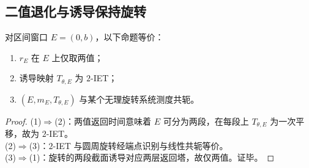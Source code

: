 \subsection{二值退化与诱导保持旋转}

\begin{theorem}[两值退化的动力学等价性]\label{thm:two-value-iet}
对区间窗口 $E=(0,b)$，以下命题等价：
\begin{enumerate}
  \item $r_E$ 在 $E$ 上仅取两值；
  \item 诱导映射 $T_{\theta,E}$ 为 $2$-IET；
  \item $(E,m_E,T_{\theta,E})$ 与某个无理旋转系统测度共轭。
\end{enumerate}
\end{theorem}

\begin{proof}
(1)$\Rightarrow$(2)：两值返回时间意味着 $E$ 可分为两段，在每段上 $T_{\theta,E}$ 为一次平移，故为 $2$-IET。\\
(2)$\Rightarrow$(3)：$2$-IET 与圆周旋转经端点识别与线性共轭等价。\\
(3)$\Rightarrow$(1)：旋转的两段截面诱导对应两层返回塔，故仅两值。证毕。
\end{proof}

